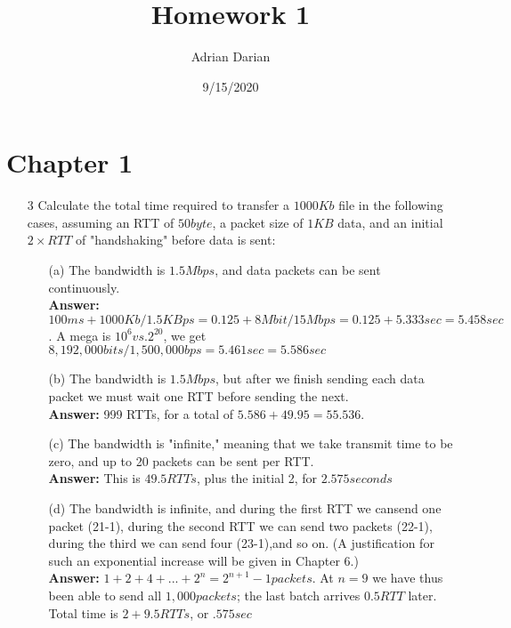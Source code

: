 \documentclass[a4paper]{article}
\title{Homework 1}
\author{Adrian Darian}
\date{9/15/2020}
\begin{document}
  
\maketitle
  
\section*{Chapter 1}
\begin{itemize}
	\item[3] Calculate the total time required to transfer a $1000 Kb$ file in the following cases, assuming an RTT of $50 byte$, a packet size of $1 KB$ data, and an initial $2 \times RTT$ of "handshaking" before data is sent:
	      \begin{itemize}
	      	\item[(a)] The bandwidth is $1.5Mbps$, and data packets can be sent continuously. \\
	      	      \textbf{Answer:} $100ms + 1000 Kb / 1.5 KBps = 0.125 + 8 Mbit / 15 Mbps = 0.125 + 5.333 sec = 5.458 sec$. A mega is $10^6 vs. 2^20$, we get $8,192,000 bits / 1,500,000 bps = 5.461 sec = 5.586 sec$ \\
	      	\item[(b)] The bandwidth is $1.5 Mbps$, but after we finish sending each data packet we must wait one RTT before sending the next. \\
	      	      \textbf{Answer:} 999 RTTs, for a total of $5.586 + 49.95 = 55.536$. \\
	      	\item[(c)] The bandwidth is "infinite," meaning that we take transmit time to be zero, and up to 20 packets can be sent per RTT. \\
	      	      \textbf{Answer:} This is $49.5 RTTs$, plus the initial 2, for $2.575 seconds$ \\
	      	\item[(d)] The bandwidth is infinite, and during the first RTT we cansend one packet (21-1), during the second RTT we can send two packets (22-1), during the third we can send four (23-1),and so on. (A justification for such an exponential increase will be given in Chapter 6.) \\
	      	      \textbf{Answer:} $1 + 2 + 4 + ... + 2^n = 2^{n+1} - 1 packets$. At $n = 9$ we have thus been able to send all $1,000 packets$; the last batch arrives $0.5 RTT$ later. Total time is $2 + 9.5 RTTs$, or $.575 sec$ \\
	      \end{itemize} 

\end{itemize}
\end{document}
